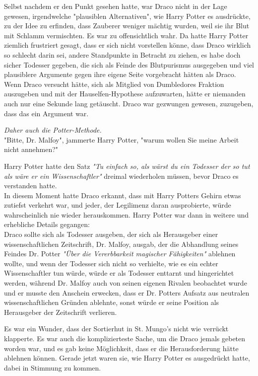 {Selbst nachdem er den Punkt gesehen hatte, war Draco nicht in der Lage gewesen, irgendwelche "plausiblen Alternativen", wie Harry Potter es ausdrückte, zu der Idee zu erfinden, dass Zauberer weniger mächtig wurden, weil sie ihr Blut mit Schlamm vermischten. Es war zu offensichtlich wahr. Da hatte Harry Potter ziemlich frustriert gesagt, dass er sich nicht vorstellen könne, dass Draco wirklich so schlecht darin sei, andere Standpunkte in Betracht zu ziehen, es habe doch sicher Todesser gegeben, die sich als Feinde des Blutpurismus ausgegeben und viel plausiblere Argumente gegen ihre eigene Seite vorgebracht hätten als Draco. Wenn Draco versucht hätte, sich als Mitglied von Dumbledores Fraktion auszugeben und mit der Hauselfen-Hypothese aufzuwarten, hätte er niemanden auch nur eine Sekunde lang getäuscht. Draco war gezwungen gewesen, zuzugeben, dass das ein Argument war.

\emph{Daher auch die Potter-Methode.}\\ "Bitte, Dr. Malfoy", jammerte Harry Potter, "warum wollen Sie meine Arbeit nicht annehmen?"

Harry Potter hatte den Satz \emph{"Tu einfach so, als wärst du ein Todesser der so tut als wäre er ein Wissenschaftler"} dreimal wiederholen müssen, bevor Draco es verstanden hatte.\\ In diesem Moment hatte Draco erkannt, dass mit Harry Potters Gehirn etwas zutiefst verkehrt war, und jeder, der Legilimenz daran ausprobierte, würde wahrscheinlich nie wieder herauskommen. Harry Potter war dann in weitere und erhebliche Details gegangen:\\ Draco sollte sich als Todesser ausgeben, der sich als Herausgeber einer wissenschaftlichen Zeitschrift, Dr. Malfoy, ausgab, der die Abhandlung seines Feindes Dr. Potter \emph{"Über die Vererbbarkeit magischer Fähigkeiten"} ablehnen wollte, und wenn der Todesser sich nicht so verhielte, wie es ein echter Wissenschaftler tun würde, würde er als Todesser enttarnt und hingerichtet werden, während Dr. Malfoy auch von seinen eigenen Rivalen beobachtet wurde und er musste den Anschein erwecken, dass er Dr. Potters Aufsatz aus neutralen wissenschaftlichen Gründen ablehnte, sonst würde er seine Position als Herausgeber der Zeitschrift verlieren.

Es war ein Wunder, dass der Sortierhut in St. Mungo's nicht wie verrückt klapperte. Es war auch die komplizierteste Sache, um die Draco jemals gebeten worden war, und es gab keine Möglichkeit, dass er die Herausforderung hätte ablehnen können. Gerade jetzt waren sie, wie Harry Potter es ausgedrückt hatte, dabei in Stimmung zu kommen.

}
